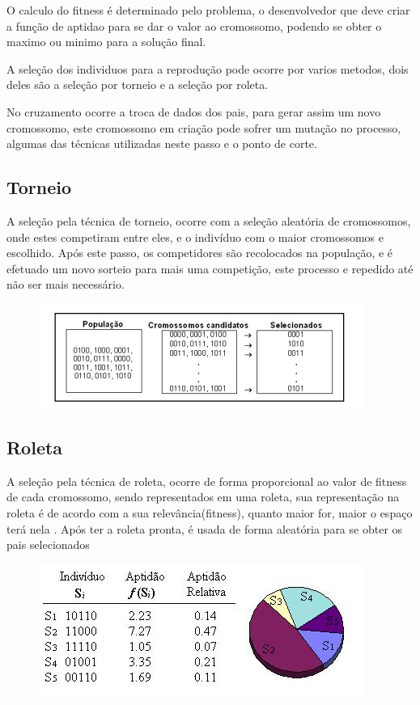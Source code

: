 \documentclass[a4paper,11pt]{article}
\begin{document}
\begin{multicols}{2}
O calculo do fitness é determinado pelo problema, o desenvolvedor que deve criar a função de aptidao para se dar o valor ao cromossomo, podendo se obter o maximo ou minimo para a solução final.

A seleção dos individuos para a reprodução pode ocorre por varios metodos, dois deles são a seleção por torneio e a seleção por roleta. 

No cruzamento ocorre a troca de dados dos pais, para gerar assim um novo cromossomo, este cromossomo em criação pode sofrer um mutação no processo, algumas das técnicas utilizadas neste passo e o ponto de corte.

\subsection{Torneio}
A seleção pela técnica de torneio, ocorre com a seleção aleatória de cromossomos, onde estes competiram entre eles, e o indivíduo com o maior cromossomos e escolhido. Após este passo, os competidores são recolocados na população, e é efetuado um novo sorteio para mais uma competição, este processo e repedido até não ser mais necessário.\cite{ref:oliveira2004b}


\begin{figure}[!htb]
	\centering
	\includegraphics{imagens/torneio}
\end{figure}

\subsection{Roleta}
A seleção pela técnica de roleta, ocorre de forma proporcional ao valor de fitness de cada cromossomo, sendo representados em uma roleta, sua representação na roleta é de acordo com a sua relevância(fitness), quanto maior for, maior o espaço terá nela \cite{ref:oliveira2009}.
Após ter a roleta pronta, é usada de forma aleatória para se obter os pais selecionados

\begin{figure}[!htb]
	\centering
	\includegraphics{imagens/roleta.jpg}
\end{figure}




\end{multicols}
\end{document}

